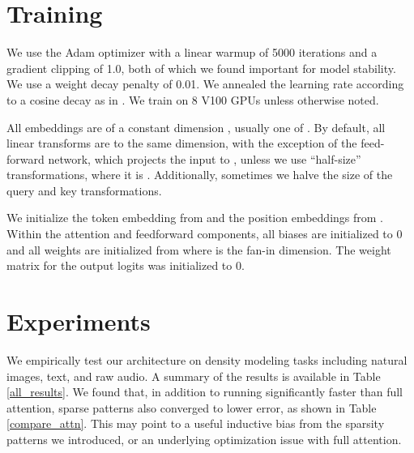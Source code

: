 \documentclass{article}
\begin{document}
\section{Training}
We use the Adam optimizer with a linear warmup of 5000 iterations and a gradient clipping of 1.0, both of which we found important for model stability. We use a weight decay penalty of 0.01. We annealed the learning rate according to a cosine decay as in \cite{radford2018}. We train on 8 V100 GPUs unless otherwise noted.

All embeddings are of a constant dimension , usually one of . By default, all linear transforms are to the same dimension, with the exception of the feed-forward network, which projects the input to , unless we use ``half-size'' transformations, where it is . Additionally, sometimes we halve the size of the query and key transformations.

We initialize the token embedding  from  and the position embeddings from . Within the attention and feedforward components, all biases are initialized to 0 and all weights are initialized from  where  is the fan-in dimension. The weight matrix for the output logits was initialized to 0.


\section{Experiments}
We empirically test our architecture on density modeling tasks including natural images, text, and raw audio. A summary of the results is available in Table \ref{all_results}. We found that, in addition to running significantly faster than full attention, sparse patterns also converged to lower error, as shown in Table \ref{compare_attn}. This may point to a useful inductive bias from the sparsity patterns we introduced, or an underlying optimization issue with full attention.
\end{document}
